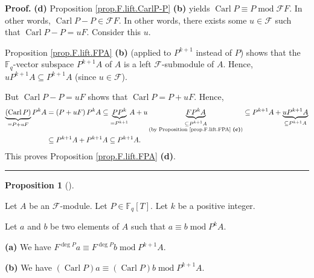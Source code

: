 \documentclass[numbers=enddot,12pt,final,onecolumn,notitlepage]{scrartcl}%
\theoremstyle{definition}
\newtheorem{prop}[theo]{Proposition}
\newenvironment{proposition}[1][]
{\begin{prop}[#1]\begin{leftbar}}
{\end{leftbar}\end{prop}}
\newenvironment{proof}[1][Proof]{\noindent\textbf{#1.} }{\ \rule{0.5em}{0.5em}}
\begin{document}
\begin{proof}
\textbf{(d)} Proposition \ref{prop.F.lift.CarlP-P} \textbf{(b)} yields
$\operatorname*{Carl}P\equiv P\operatorname{mod}\mathcal{F}F$. In other words,
$\operatorname*{Carl}P-P\in\mathcal{F}F$. In other words, there exists some
$u\in\mathcal{F}$ such that $\operatorname*{Carl}P-P=uF$. Consider this $u$.

Proposition \ref{prop.F.lift.FPA} \textbf{(b)} (applied to $P^{k+1}$ instead
of $P$) shows that the $\mathbb{F}_{q}$-vector subspace $P^{k+1}A$ of $A$ is a
left $\mathcal{F}$-submodule of $A$. Hence, $uP^{k+1}A\subseteq P^{k+1}A$
(since $u\in\mathcal{F}$).

But $\operatorname*{Carl}P-P=uF$ shows that $\operatorname*{Carl}P=P+uF$.
Hence,%
\begin{align*}
\underbrace{\left(  \operatorname*{Carl}P\right)  }_{=P+uF}P^{k}A  &  =\left(
P+uF\right)  P^{k}A\subseteq\underbrace{PP^{k}}_{=P^{k+1}}%
A+u\underbrace{FP^{k}A}_{\substack{\subseteq P^{k+1}A\\\text{(by Proposition
\ref{prop.F.lift.FPA} \textbf{(c)})}}}\subseteq P^{k+1}A+\underbrace{uP^{k+1}%
A}_{\subseteq P^{k+1}A}\\
&  \subseteq P^{k+1}A+P^{k+1}A\subseteq P^{k+1}A.
\end{align*}
This proves Proposition \ref{prop.F.lift.FPA} \textbf{(d)}.
\end{proof}

\begin{proposition}
\label{prop.F.lift.lift-P}Let $A$ be an $\mathcal{F}$-module. Let
$P\in\mathbb{F}_{q}\left[  T\right]  $. Let $k$ be a positive integer.

Let $a$ and $b$ be two elements of $A$ such that $a\equiv b\operatorname{mod}%
P^{k}A$.

\textbf{(a)} We have $F^{\deg P}a\equiv F^{\deg P}b\operatorname{mod}P^{k+1}A$.

\textbf{(b)} We have $\left(  \operatorname*{Carl}P\right)  a\equiv\left(
\operatorname*{Carl}P\right)  b\operatorname{mod}P^{k+1}A$.
\end{proposition}
\end{document}
